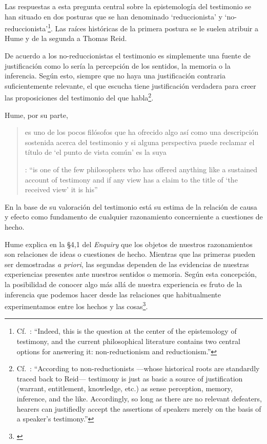 Las respuestas a esta pregunta central sobre la epistemología del testimonio se han situado en dos posturas que se han denominado `reduccionista' y `no-reduccionista'\footnote{Cf.~\cite[4]{lackeysosa2006eptest}: \enquote{Indeed, this is the question at the center of the epistemology of testimony, and the current philosophical literature contains two central options for answering it: non-reductionism and reductionism.}}. Las raíces históricas de la primera postura se le suelen atribuir a Hume y de la segunda a Thomas Reid.

De acuerdo a los no-reduccionistas el testimonio es simplemente una fuente de justificación como lo sería la percepción de los sentidos, la memoria o la inferencia. Según esto, siempre que no haya una justificación contraria suficientemente relevante, el que escucha tiene justificación verdadera para creer las proposiciones del testimonio del que habla\footnote{Cf.~\cite[4]{lackeysosa2006eptest}: \enquote{According to non-reductionists ---whose historical roots are standardly traced back to Reid--- testimony is just as basic a source of justification (warrant, entitlement, knowledge, etc.) as sense perception, memory, inference, and the like. Accordingly, so long as there are no relevant defeaters, hearers can justifiedly accept the assertions of speakers merely on the basis of a speaker's testimony.}}.

Hume, por su parte, \blockquote[{\cite[79]{coady1992test}}: \enquote{is one of the few philosophers who has offered anything like a sustained account of testimony and if any view has a claim to the title of `the received view' it is his}]{es uno de los pocos filósofos que ha ofrecido algo así como una descripción sostenida acerca del testimonio y si alguna perspectiva puede reclamar el título de `el punto de vista común' es la suya}. En la base de su valoración del testimonio está su estima de la relación de causa y efecto como fundamento de cualquier razonamiento concerniente a cuestiones de hecho.

Hume explica en la \S4,1 del \emph{Enquiry} que los objetos de nuestros razonamientos son relaciones de ideas o cuestiones de hecho. Mientras que las primeras pueden ser demostradas \emph{a priori}, las segundas dependen de las evidencias de nuestras experiencias presentes ante nuestros sentidos o memoria. Según esta concepción, la posibilidad de conocer algo más allá de nuestra experiencia es fruto de la inferencia que podemos hacer desde las relaciones que habitualmente experimentamos entre los hechos y las cosas\footnote{\cite[Cf.~][\S4, 1. 47-54]{hume1777enquiryes}}.

